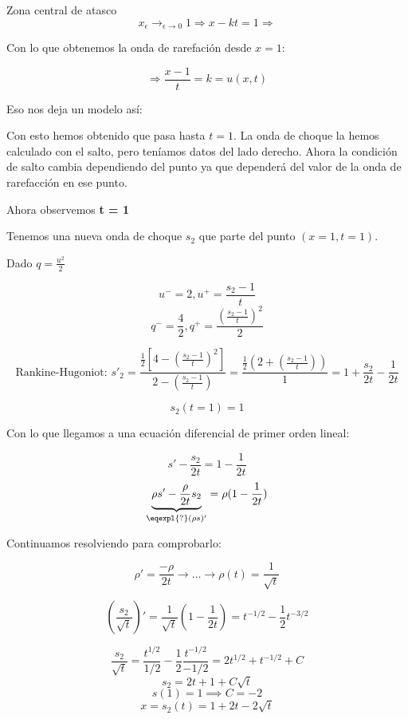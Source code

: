 \begin{example}{Zona central de atasco}
			$$x_\epsilon \rightarrow_{\epsilon \rightarrow 0} 1 \Rightarrow x - kt = 1 \Rightarrow $$

			Con lo que obtenemos la onda de rarefación desde $x=1$:

			$$\Rightarrow 	\frac{x-1}{t} = k = u(x,t)$$

			Eso nos deja un modelo así:

			\begin{figure}[hbtp]
				\centering
				\caption{}
				\label{fig:ModeloTresVelocidades}
			\end{figure}

			Con esto hemos obtenido que pasa hasta $t = 1$. La onda de choque la hemos calculado con el salto, pero teníamos datos del lado derecho. Ahora la condición de salto cambia dependiendo del punto ya que dependerá del valor de la onda de rarefacción en ese punto.

			Ahora observemos \textbf{t = 1}

			Tenemos una nueva onda de choque $s_2$ que parte del punto $(x=1, t=1)$.

			Dado $q = \frac{u^2}{2}$

			$$u^{-} = 2, u^{+} = \frac{s_2-1}{t}$$
			$$q^{-} = \frac{4}{2}, q^{+} = \frac{(\frac{s_2-1}{t})^2}{2}$$

			$$ \text{Rankine-Hugoniot: } s'_2 = \frac{\frac{1}{2}[4 - (\frac{s_2 - 1}{t})^2 ]}{2-(\frac{s_2 - 1}{t})} = \frac{\frac{1}{2}(2 + (\frac{s_2 - 1}{t}))}{1} = 1 + \frac{s_2}{2t} - \frac{1}{2t}$$

			$$s_2(t = 1) = 1$$

			Con lo que llegamos a una ecuación diferencial de primer orden lineal:

			$$s' - \frac{s_2}{2t} = 1 - \frac{1}{2t}$$
			$$  \underbrace{\rho s' - \frac{\rho}{2t} s_2}_{\eqexpl{?} (\rho s)' } = \rho(1 - \frac{1}{2t})$$

			Continuamos resolviendo para comprobarlo:

			$$\rho' = \frac{-\rho}{2t} \rightarrow … \rightarrow \rho(t) = \frac{1}{\sqrt{t}}$$

			$$(\frac{s_2}{\sqrt{t}})' = \frac{1}{\sqrt{t}} ( 1 - \frac{1}{2t}) = t^{-1/2} - \frac{1}{2} t^{-3/2}$$

			$$\frac{s_2}{\sqrt{t}} = \frac{t^{1/2}}{1/2} - \frac{1}{2} \frac{t^{-1/2}}{-1/2} = 2t^{1/2} + t^{-1/2} + C$$
			$$ s_2 = 2t + 1 + C \sqrt{t} $$
			$$ s(1) = 1 \implies C = -2 $$
			$$ x = s_2 (t) = 1 + 2t - 2 \sqrt{t} $$


\end{example}
